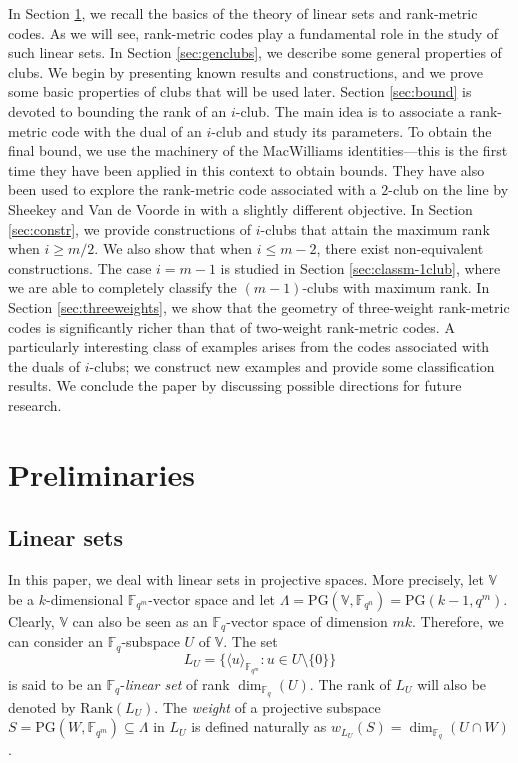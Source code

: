 \documentclass[11pt]{amsart}
\theoremstyle{definition}
\newcommand{\fqn}{\mathbb{F}_{q^n}}
\newcommand{\fq}{{\mathbb F}_{q}}
\newcommand{\PG}{\mathrm{PG}}
\newcommand{\fqm}{\mathbb{F}_{q^m}}
\begin{document}
In Section \ref{sec:prel}, we recall the basics of the theory of linear sets and rank-metric codes. As we will see, rank-metric codes play a fundamental role in the study of such linear sets.
In Section \ref{sec:genclubs}, we describe some general properties of clubs. We begin by presenting known results and constructions, and we prove some basic properties of clubs that will be used later.
Section \ref{sec:bound} is devoted to bounding the rank of an $i$-club. The main idea is to associate a rank-metric code with the dual of an $i$-club and study its parameters. To obtain the final bound, we use the machinery of the MacWilliams identities—this is the first time they have been applied in this context to obtain bounds.
They have also been used to explore the rank-metric code associated with a $2$-club on the line by Sheekey and Van de Voorde in \cite{sheekeyVdV} with a slightly different objective.
In Section \ref{sec:constr}, we provide constructions of $i$-clubs that attain the maximum rank when $i \geq m/2$. We also show that when $i \leq m-2$, there exist non-equivalent constructions.
The case $i = m - 1$ is studied in Section \ref{sec:classm-1club}, where we are able to completely classify the $(m-1)$-clubs with maximum rank.
In Section \ref{sec:threeweights}, we show that the geometry of three-weight rank-metric codes is significantly richer than that of two-weight rank-metric codes. A particularly interesting class of examples arises from the codes associated with the duals of $i$-clubs; we construct new examples and provide some classification results.
We conclude the paper by discussing possible directions for future research.


\section{Preliminaries}\label{sec:prel}

\subsection{Linear sets}

In this paper, we deal with linear sets in projective spaces.
More precisely, let $\mathbb{V}$ be a $k$-dimensional $\fqm$-vector space and let $\Lambda=\PG(\mathbb{V},\fqn)=\PG(k-1,q^m)$. 
Clearly, $\mathbb{V}$ can also be seen as an $\fq$-vector space of dimension $mk$. Therefore, we can consider an $\fq$-subspace $U$ of $\mathbb{V}$. 
The set
\[ L_U=\{\langle {u} \rangle_{\fqm} \colon {u}\in U\setminus\{{0}\}\} \]
is said to be an $\fq$-\emph{linear set} of rank $\dim_{\fq}(U)$.
The rank of $L_U$ will also be denoted by $\mathrm{Rank}(L_U)$.
The \emph{weight} of a projective subspace $S=\PG(W,\fqm) \subseteq \Lambda$ in $L_U$ is defined naturally as $w_{L_U}(S)=\dim_{\fq}(U \cap W)$.
\end{document}
